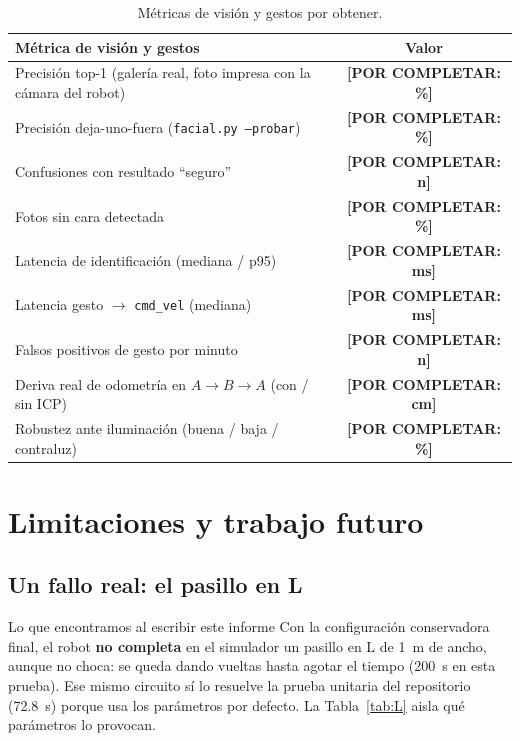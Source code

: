 \documentclass[11pt,a4paper]{article}
\newcommand{\pend}[1]{\textcolor{rojo}{\textbf{[POR COMPLETAR: #1]}}}
\newcommand{\cmd}[1]{\texttt{\small #1}}
\begin{document}
\begin{table}[H]
\centering\small
\begin{tabular}{@{}lc@{}}
\toprule
\textbf{M\'etrica de visi\'on y gestos} & \textbf{Valor} \\
\midrule
Precisi\'on top-1 (galer\'ia real, foto impresa con la c\'amara del robot) & \pend{\%} \\
Precisi\'on deja-uno-fuera (\cmd{facial.py --probar}) & \pend{\%} \\
Confusiones con resultado ``seguro'' & \pend{n} \\
Fotos sin cara detectada & \pend{\%} \\
Latencia de identificaci\'on (mediana / p95) & \pend{ms} \\
Latencia gesto $\to$ \cmd{cmd\_vel} (mediana) & \pend{ms} \\
Falsos positivos de gesto por minuto & \pend{n} \\
Deriva real de odometr\'ia en $A\to B\to A$ (con / sin ICP) & \pend{cm} \\
Robustez ante iluminaci\'on (buena / baja / contraluz) & \pend{\%} \\
\bottomrule
\end{tabular}
\caption{M\'etricas de visi\'on y gestos por obtener.}
\end{table}

\section{Limitaciones y trabajo futuro}
\label{sec:futuro}
\subsection{Un fallo real: el pasillo en L}
\begin{alerta}{Lo que encontramos al escribir este informe}
Con la configuraci\'on conservadora final, el robot \textbf{no completa} en el simulador un pasillo en L de 1~m de ancho, aunque no choca: se queda dando vueltas hasta agotar el tiempo (200~s en esta prueba).
Ese mismo circuito s\'i lo resuelve la prueba unitaria del repositorio (72.8~s) porque usa los par\'ametros por defecto. La Tabla~\ref{tab:L} aisla qu\'e par\'ametros lo provocan.
\end{alerta}
\end{document}
